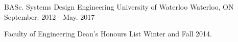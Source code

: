 

\begin{cventries}

  \cventry
    {BASc. Systems Design Engineering} %
    {University of Waterloo} %
    {Waterloo, ON} %
    {September. 2012 - May. 2017} %
    {
      \begin{cvitems} %
      	\item{Faculty of Engineering Dean’s Honours List Winter and Fall 2014.}
      \end{cvitems}
    }

\end{cventries}
